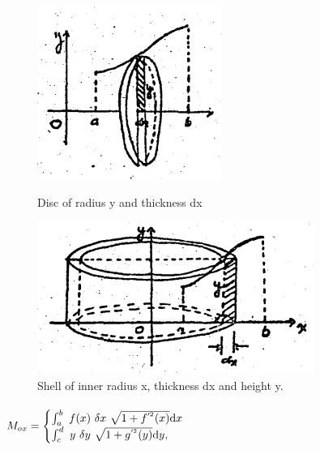 \documentclass[11pt]{amsbook}
\begin{document}
\begin{figure}[htb]
	\begin{minipage}{0.45\textwidth}
		\centering
    	\includegraphics[width=\textwidth]{images/b1p2-482-fig02}
		\caption{Disc of radius y and thickness dx}
	\end{minipage}
	\begin{minipage}{0.45\textwidth}
		\centering
    	\includegraphics[width=\textwidth]{images/b1p2-482-fig03}
		\caption{Shell of inner radius x, thickness dx and height y.}
	\end{minipage}
\end{figure}

	\paragraph{}$M_{ox} = 
	\begin{cases}	\int_{a}^{b} \  f(x) \ \delta{x} \ \sqrt{1 + f^{'^{2}}(x)}\mathrm{d} {x} \\ \int_{c}^{d} \  y \ \delta{y} \ \sqrt{1 + g^{'^{2}}(y)}\mathrm{d} {y}, \\ \end{cases}$ \\ 
\end{document}
